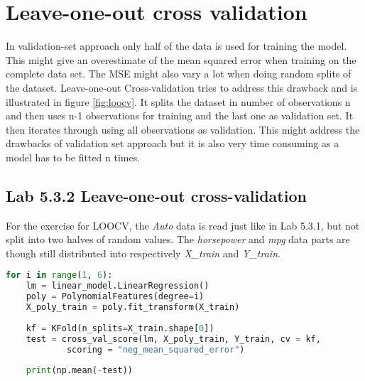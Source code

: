 \section{Leave-one-out cross validation}
In validation-set approach only half of the data is used for training the model. This might give an overestimate of the mean squared error when training on the complete data set. The MSE might also vary a lot when doing random splits of the dataset. Leave-one-out Cross-validation tries to address this drawback and is illustrated in figure \ref{fig:loocv}. It splits the dataset in number of observations n and then uses n-1 observations for training and the last one as validation set. It then iterates through using all observations as validation. This might address the drawbacks of validation set approach but it is also very time consuming as a model has to be fitted n times.


\subsection{Lab 5.3.2 Leave-one-out cross-validation}
For the exercise for LOOCV, the \emph{Auto} data is read just like in Lab 5.3.1, but not split into two halves of random values. The \emph{horsepower} and \emph{mpg} data parts are though still distributed into respectively \emph{X\_train} and \emph{Y\_train}. 

\begin{lstlisting}[language=Python, label=lst:LOOCV, caption=Leave-one-out Cross-validation loop]
for i in range(1, 6):
	lm = linear_model.LinearRegression()
	poly = PolynomialFeatures(degree=i)
	X_poly_train = poly.fit_transform(X_train)
	
	kf = KFold(n_splits=X_train.shape[0]) 
	test = cross_val_score(lm, X_poly_train, Y_train, cv = kf, 
			scoring = "neg_mean_squared_error")
	
	print(np.mean(-test))
\end{lstlisting}

